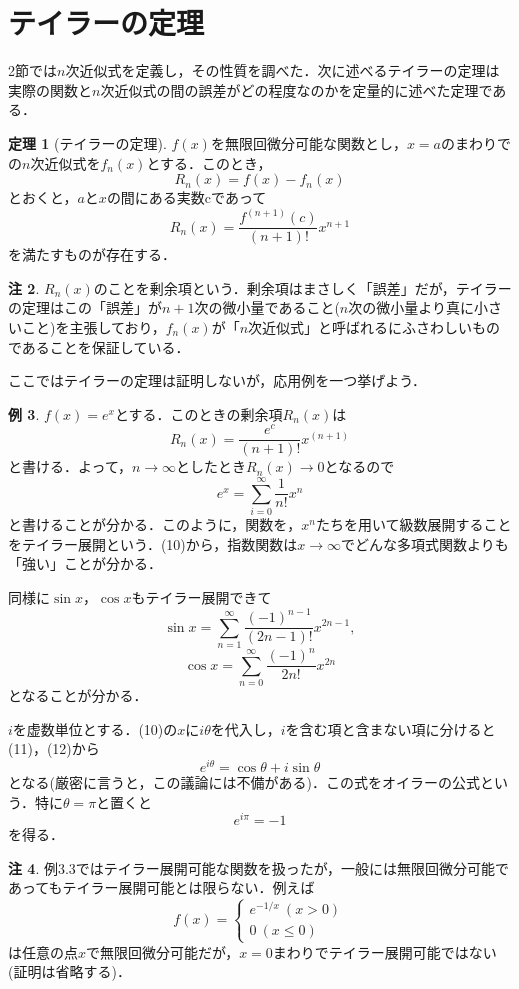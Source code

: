 \documentclass[uplatex]{jsarticle}
\theoremstyle{definition}
\newtheorem{theorem}{定理}[section]
\newtheorem{example}[theorem]{例}
\newtheorem{remark}[theorem]{注}
\begin{document}
\section{テイラーの定理}
2節では$n$次近似式を定義し，その性質を調べた．次に述べるテイラーの定理は実際の関数と$n$次近似式の間の誤差がどの程度なのかを定量的に述べた定理である．
\begin{theorem}[テイラーの定理]
$f(x)$を無限回微分可能な関数とし，$x=a$のまわりでの$n$次近似式を$f_n(x)$とする．このとき，
\begin{equation}
R_n(x)=f(x)-f_n(x)
\end{equation}
とおくと，$a$と$x$の間にある実数cであって
\begin{equation}
R_n(x)=\frac{f^{(n+1)}(c)}{(n+1)!}x^{n+1}
\end{equation}
を満たすものが存在する．
\end{theorem}
\begin{remark}
$R_n(x)$のことを剰余項という．剰余項はまさしく「誤差」だが，テイラーの定理はこの「誤差」が$n+1$次の微小量であること($n$次の微小量より真に小さいこと)を主張しており，$f_n(x)$が「$n$次近似式」と呼ばれるにふさわしいものであることを保証している．
\end{remark}
ここではテイラーの定理は証明しないが，応用例を一つ挙げよう．
\begin{example}
$f(x)=e^x$とする．このときの剰余項$R_n(x)$は
\[ R_n(x)=\frac{e^c}{(n+1)!}x^{(n+1)} \]
と書ける．よって，$n\to \infty$としたとき$R_n(x)\to 0$となるので
\begin{equation}
e^x=\sum_{i=0}^{\infty} \frac{1}{n!}x^n
\end{equation}
と書けることが分かる．このように，関数を，$x^n$たちを用いて級数展開することをテイラー展開という．(10)から，指数関数は$x\to \infty$でどんな多項式関数よりも「強い」ことが分かる．

同様に$\sin x，\cos x$もテイラー展開できて
\begin{equation}
\sin x=\sum_{n=1}^{\infty} \frac{(-1)^{n-1}}{(2n-1)!}x^{2n-1},
\end{equation}
\begin{equation}
\cos x=\sum_{n=0}^{\infty} \frac{(-1)^n}{2n!}x^{2n}
\end{equation}
となることが分かる．

$i$を虚数単位とする．(10)の$x$に$i\theta$を代入し，$i$を含む項と含まない項に分けると(11)，(12)から
\begin{equation}
e^{i\theta}=\cos \theta+i\sin \theta
\end{equation}
となる(厳密に言うと，この議論には不備がある)．この式をオイラーの公式という．特に$\theta=\pi$と置くと
\[ e^{i\pi}=-1 \]
を得る．
\end{example}
\begin{remark}
例3.3ではテイラー展開可能な関数を扱ったが，一般には無限回微分可能であってもテイラー展開可能とは限らない．例えば
\[f(x)=
\begin{cases}
e^{-1/x} \ (x>0) \\
0 \      (x\le 0)
\end{cases} \]
は任意の点$x$で無限回微分可能だが，$x=0$まわりでテイラー展開可能ではない(証明は省略する)．
\end{remark}
\end{document}
